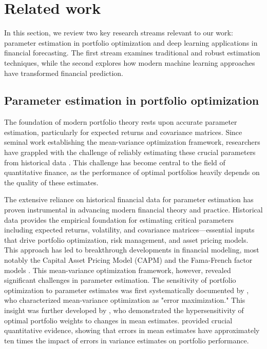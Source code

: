 \section{Related work}
In this section, we review two key research streams relevant to our work: parameter estimation in portfolio optimization and deep learning applications in financial forecasting. The first stream examines traditional and robust estimation techniques, while the second explores how modern machine learning approaches have transformed financial prediction. 

\subsection{Parameter estimation in portfolio optimization}
The foundation of modern portfolio theory rests upon accurate parameter estimation, particularly for expected returns and covariance matrices. Since \cite{Markowitz1952} seminal work establishing the mean-variance optimization framework, researchers have grappled with the challenge of reliably estimating these crucial parameters from historical data \cite{tan2020estimation, firoozye2023canonical}. This challenge has become central to the field of quantitative finance, as the performance of optimal portfolios heavily depends on the quality of these estimates.

The extensive reliance on historical financial data for parameter estimation has proven instrumental in advancing modern financial theory and practice. Historical data provides the empirical foundation for estimating critical parameters including expected returns, volatility, and covariance matrices—essential inputs that drive portfolio optimization, risk management, and asset pricing models. This approach has led to breakthrough developments in financial modeling, most notably the Capital Asset Pricing Model (CAPM) \citep{sharpe1964capital, lintner1975valuation} and the Fama-French factor models \citep{fama1993common,fama2015five}. This mean-variance optimization framework, however, revealed significant challenges in parameter estimation. The sensitivity of portfolio optimization to parameter estimates was first systematically documented by \cite{michaud1989markowitz}, who characterized mean-variance optimization as "error maximization." This insight was further developed by \cite{best1991sensitivity}, who demonstrated the hypersensitivity of optimal portfolio weights to changes in mean estimates. \citep{chopra1993effect, chung2022effects} provided crucial quantitative evidence, showing that errors in mean estimates have approximately ten times the impact of errors in variance estimates on portfolio performance.

